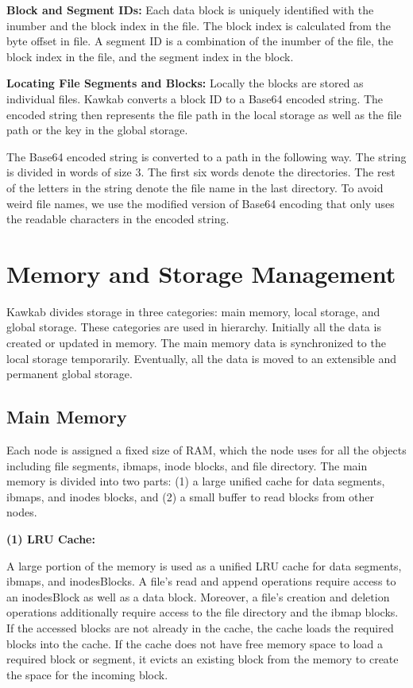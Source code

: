 \documentclass[]{article}
\newcommand{\subtopic}[1]{\vspace{1.5pt} \noindent \textbf{#1}}
\begin{document}

\subtopic{Block and Segment IDs:} Each data block is uniquely identified with
the inumber and the block index in the file.  The block index is calculated
from the byte offset in file.  A segment ID is a combination of the inumber of
the file, the block index in the file, and the segment index in the block.


\subtopic{Locating File Segments and Blocks:} Locally the blocks are stored as
individual files.  Kawkab converts a block ID to a Base64 encoded string. The
encoded string then represents the file path in the local storage as well as
the file path or the key in the global storage.

The Base64 encoded string is converted to a path in the following way.  The
string is divided in words of size 3. The first six words denote the
directories. The rest of the letters in the string denote the file name in the
last directory. To avoid weird file names, we use the modified version of
Base64 encoding that only uses the readable characters in the encoded string.


\section{Memory and Storage Management}

Kawkab divides storage in three categories: main memory, local storage, and global
storage. These categories are used in hierarchy. Initially all the data
is created or updated in memory. The main memory data is synchronized to the
local storage temporarily. Eventually, all the data is moved to an extensible
and permanent global storage.


\subsection{Main Memory}

Each node is assigned a fixed size of RAM, which the node uses 
for all the objects including file segments, ibmaps, inode blocks, and
file directory. The main memory is divided into two parts: (1) a large
unified cache for data segments, ibmaps, and inodes blocks, and (2) a small
buffer to read blocks from other nodes.


\subtopic{(1) LRU Cache:} 

A large portion of the memory is used as a unified LRU cache for data segments,
ibmaps, and inodesBlocks.  A file's read and append operations require access
to an inodesBlock as well as a data block. Moreover, a file's creation and
deletion operations additionally require access to the file directory and the
ibmap blocks. If the accessed blocks are not already in the cache, the cache
loads the required blocks into the cache.  If the cache does not have free
memory space to load a required block or segment, it evicts an existing block
from the memory to create the space for the incoming block. 
\end{document}
